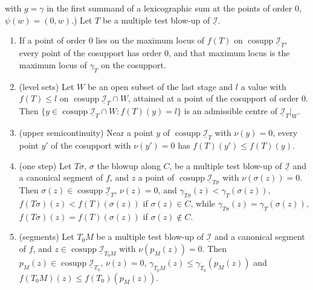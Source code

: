 \begin{lemma}
with \(g=\gamma\) in the first summand of a lexicographic sum at the points of order \(0\), \(\psi(w)=(0,w)\).) Let \(T\) be a multiple test blow-up of
\(\underline{\mathcal I}\).
\begin{enumerate}
\item If a point of order \(0\) lies on the maximum locus of \(f(T)\) on \(\operatorname{cosupp}\underline{\mathcal I}_T\), every point of the cosupport has order \(0\), and
that maximum locus is the maximum locus of \(\gamma_T\) on the cosupport.
\item (level sets) Let \(W\) be an open subset of the last stage and \(l\) a value with \(f(T)\le l\) on \(\operatorname{cosupp}\underline{\mathcal I}_T\cap W\), attained at a point
of the cosupport of order \(0\). Then \(\{y\in\operatorname{cosupp}\underline{\mathcal I}_T\cap W:f(T)(y)=l\}\) is an admissible centre of \(\underline{\mathcal I}_T|_W\).
\item (upper semicontinuity) Near a point \(y\) of \(\operatorname{cosupp}\underline{\mathcal I}_T\) with \(\nu(y)=0\), every point \(y'\) of the cosupport with \(\nu(y')=0\)
has \(f(T)(y')\le f(T)(y)\).
\item (one step) Let \(T\sigma\), \(\sigma\) the blowup along \(C\), be a multiple test blow-up of \(\underline{\mathcal I}\) and a canonical segment of \(f\), and \(z\) a point of
\(\operatorname{cosupp}\underline{\mathcal I}_{T\sigma}\) with \(\nu(\sigma(z))=0\). Then \(\sigma(z)\in\operatorname{cosupp}\underline{\mathcal I}_T\), \(\nu(z)=0\), and
\(\gamma_{T\sigma}(z)<\gamma_T(\sigma(z))\), \(f(T\sigma)(z)<f(T)(\sigma(z))\) if \(\sigma(z)\in C\), while \(\gamma_{T\sigma}(z)=\gamma_T(\sigma(z))\),
\(f(T\sigma)(z)=f(T)(\sigma(z))\) if \(\sigma(z)\notin C\).
\item (segments) Let \(T_0M\) be a multiple test blow-up of \(\underline{\mathcal I}\) and a canonical segment of \(f\), and \(z\in\operatorname{cosupp}\underline{\mathcal I}_{T_0M}\)
with \(\nu(p_M(z))=0\). Then \(p_M(z)\in\operatorname{cosupp}\underline{\mathcal I}_{T_0}\), \(\nu(z)=0\), \(\gamma_{T_0M}(z)\le\gamma_{T_0}(p_M(z))\) and
\(f(T_0M)(z)\le f(T_0)(p_M(z))\).
\end{enumerate}
\end{lemma}
